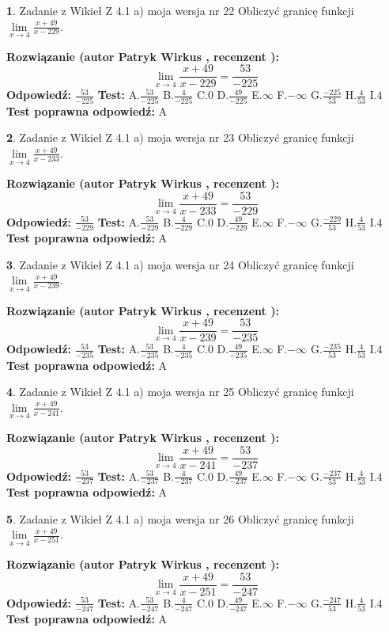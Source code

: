 \documentclass[12pt, a4paper]{article}
\theoremstyle{definition} %
\newtheorem{zad}{}
\newcommand{\zadStart}[1]{\begin{zad}#1\newline}
\newcommand{\zadStop}{\end{zad}}
\newcommand{\rozwStart}[2]{\noindent \textbf{Rozwiązanie (autor #1 , recenzent #2): }\newline}
\newcommand{\rozwStop}{\newline}
\newcommand{\odpStart}{\noindent \textbf{Odpowiedź:}\newline}
\newcommand{\odpStop}{\newline}
\newcommand{\testStart}{\noindent \textbf{Test:}\newline}
\newcommand{\testStop}{\newline}
\newcommand{\kluczStart}{\noindent \textbf{Test poprawna odpowiedź:}\newline}
\newcommand{\kluczStop}{\newline}
\begin{document}
\zadStart{Zadanie z Wikieł Z 4.1 a) moja wersja nr 22}
Obliczyć granicę funkcji $\lim\limits_{x\to4}\frac{x+49}{x-229}$.
\zadStop
\rozwStart{Patryk Wirkus}{}
$$\lim\limits_{x\to4}\frac{x+49}{x-229} = \frac{53}{-225}$$
\rozwStop
\odpStart
$\frac{53}{-225}$
\odpStop
\testStart
A.$\frac{53}{-225}$
B.$\frac{4}{-225}$
C.$0$
D.$\frac{49}{-225}$
E.$\infty$
F.$-\infty$
G.$\frac{-225}{53}$
H.$\frac{4}{53}$
I.$4$
\testStop
\kluczStart
A
\kluczStop



\zadStart{Zadanie z Wikieł Z 4.1 a) moja wersja nr 23}
Obliczyć granicę funkcji $\lim\limits_{x\to4}\frac{x+49}{x-233}$.
\zadStop
\rozwStart{Patryk Wirkus}{}
$$\lim\limits_{x\to4}\frac{x+49}{x-233} = \frac{53}{-229}$$
\rozwStop
\odpStart
$\frac{53}{-229}$
\odpStop
\testStart
A.$\frac{53}{-229}$
B.$\frac{4}{-229}$
C.$0$
D.$\frac{49}{-229}$
E.$\infty$
F.$-\infty$
G.$\frac{-229}{53}$
H.$\frac{4}{53}$
I.$4$
\testStop
\kluczStart
A
\kluczStop



\zadStart{Zadanie z Wikieł Z 4.1 a) moja wersja nr 24}
Obliczyć granicę funkcji $\lim\limits_{x\to4}\frac{x+49}{x-239}$.
\zadStop
\rozwStart{Patryk Wirkus}{}
$$\lim\limits_{x\to4}\frac{x+49}{x-239} = \frac{53}{-235}$$
\rozwStop
\odpStart
$\frac{53}{-235}$
\odpStop
\testStart
A.$\frac{53}{-235}$
B.$\frac{4}{-235}$
C.$0$
D.$\frac{49}{-235}$
E.$\infty$
F.$-\infty$
G.$\frac{-235}{53}$
H.$\frac{4}{53}$
I.$4$
\testStop
\kluczStart
A
\kluczStop



\zadStart{Zadanie z Wikieł Z 4.1 a) moja wersja nr 25}
Obliczyć granicę funkcji $\lim\limits_{x\to4}\frac{x+49}{x-241}$.
\zadStop
\rozwStart{Patryk Wirkus}{}
$$\lim\limits_{x\to4}\frac{x+49}{x-241} = \frac{53}{-237}$$
\rozwStop
\odpStart
$\frac{53}{-237}$
\odpStop
\testStart
A.$\frac{53}{-237}$
B.$\frac{4}{-237}$
C.$0$
D.$\frac{49}{-237}$
E.$\infty$
F.$-\infty$
G.$\frac{-237}{53}$
H.$\frac{4}{53}$
I.$4$
\testStop
\kluczStart
A
\kluczStop



\zadStart{Zadanie z Wikieł Z 4.1 a) moja wersja nr 26}
Obliczyć granicę funkcji $\lim\limits_{x\to4}\frac{x+49}{x-251}$.
\zadStop
\rozwStart{Patryk Wirkus}{}
$$\lim\limits_{x\to4}\frac{x+49}{x-251} = \frac{53}{-247}$$
\rozwStop
\odpStart
$\frac{53}{-247}$
\odpStop
\testStart
A.$\frac{53}{-247}$
B.$\frac{4}{-247}$
C.$0$
D.$\frac{49}{-247}$
E.$\infty$
F.$-\infty$
G.$\frac{-247}{53}$
H.$\frac{4}{53}$
I.$4$
\testStop
\kluczStart
A
\kluczStop
\end{document}
